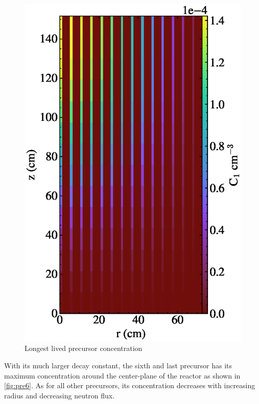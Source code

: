 \documentclass{article}
\begin{document}
\begin{figure}
  \centering
  \includegraphics{auto_diff_rho_pre1.eps}
  \caption{Longest lived precursor concentration}
  \label{fig:pre1}
\end{figure}

With its much larger decay constant, the sixth and last precursor has its
maximum concentration around the center-plane of the reactor as shown in
\cref{fig:pre6}. As for all other precursors, its concentration decreases with
increasing radius and decreasing neutron flux.
\end{document}
